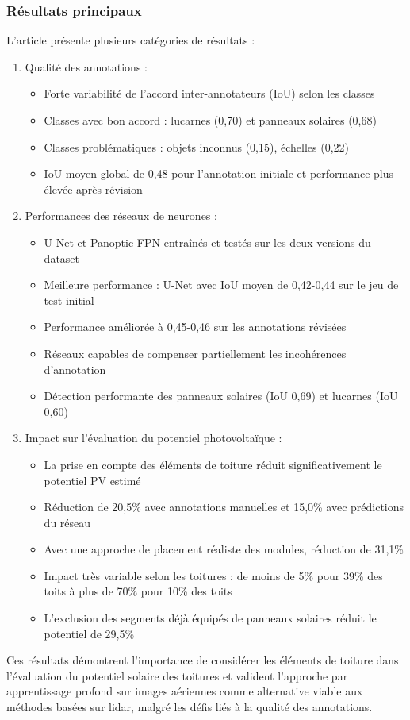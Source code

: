 \subsubsection{Résultats principaux}
L'article présente plusieurs catégories de résultats :
\begin{enumerate}
    \item Qualité des annotations :
    \begin{itemize}
        \item Forte variabilité de l'accord inter-annotateurs (IoU) selon les classes
        \item Classes avec bon accord : lucarnes (0,70) et panneaux solaires (0,68)
        \item Classes problématiques : objets inconnus (0,15), échelles (0,22)
        \item IoU moyen global de 0,48 pour l'annotation initiale et performance plus élevée après révision
    \end{itemize}
    \item Performances des réseaux de neurones :
    \begin{itemize}
        \item U-Net et Panoptic FPN entraînés et testés sur les deux versions du dataset
        \item Meilleure performance : U-Net avec IoU moyen de 0,42-0,44 sur le jeu de test initial
        \item Performance améliorée à 0,45-0,46 sur les annotations révisées
        \item Réseaux capables de compenser partiellement les incohérences d'annotation
        \item Détection performante des panneaux solaires (IoU 0,69) et lucarnes (IoU 0,60)
    \end{itemize}
    \item Impact sur l'évaluation du potentiel photovoltaïque :
    \begin{itemize}
        \item La prise en compte des éléments de toiture réduit significativement le potentiel PV estimé
        \item Réduction de 20,5\% avec annotations manuelles et 15,0\% avec prédictions du réseau
        \item Avec une approche de placement réaliste des modules, réduction de 31,1\%
        \item Impact très variable selon les toitures : de moins de 5\% pour 39\% des toits à plus de 70\% pour 10\% des toits
        \item L'exclusion des segments déjà équipés de panneaux solaires réduit le potentiel de 29,5\%
    \end{itemize}
\end{enumerate}
\par{Ces résultats démontrent l'importance de considérer les éléments de toiture dans l'évaluation du potentiel solaire des toitures et valident l'approche par apprentissage profond sur images aériennes comme alternative viable aux méthodes basées sur \gls{lidar}, malgré les défis liés à la qualité des annotations.}

